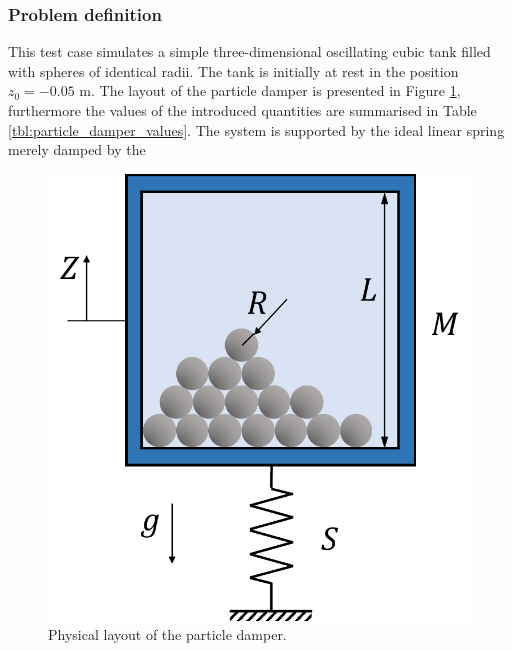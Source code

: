 \documentclass[a4paper,12pt,openany]{book}
\theoremstyle{break}
\begin{document}
\subsubsection{Problem definition}
This test case simulates a simple three-dimensional oscillating cubic tank filled with spheres of identical radii. The tank is initially at rest in the position $z_0=-0.05$ m. The layout of the particle damper is presented in Figure \ref{fig:particle_damper_geom}, furthermore the values of the introduced quantities are summarised in Table \ref{tbl:particle_damper_values}. The system is supported by the ideal linear spring  merely damped by the 
\begin{figure}[h!]
  \includegraphics[scale=0.5]{particle_damper_geom.pdf}
  \centering
  \caption{Physical layout of the particle damper.}
  \label{fig:particle_damper_geom}
\end{figure}\vspace*{3pt}
\end{document}
